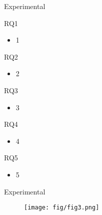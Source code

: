 \documentclass[
10pt,
aspectratio=169,
]{beamer}
\begin{document}
\begin{frame}[c]{Experimental}
	\footnotesize
	\begin{block}{RQ1}
		\begin{itemize}
			\item 1
		\end{itemize}
	\end{block}
	\begin{exampleblock}{RQ2}
		\begin{itemize}
			\item 2
		\end{itemize}
	\end{exampleblock}
	\begin{alertblock}{RQ3}
		\begin{itemize}
			\item 3
		\end{itemize}
	\end{alertblock}
	\begin{exampleblock}{RQ4}
		\begin{itemize}
			\item 4
		\end{itemize}
	\end{exampleblock}
	\begin{block}{RQ5}
		\begin{itemize}
			\item 5
		\end{itemize}
	\end{block}
	
\end{frame}
\begin{frame}[c]{Experimental}
	\footnotesize
	\begin{figure}
		\centering
		\texttt{[image: fig/fig3.png]}
	\end{figure}
\end{frame}

\end{document}
